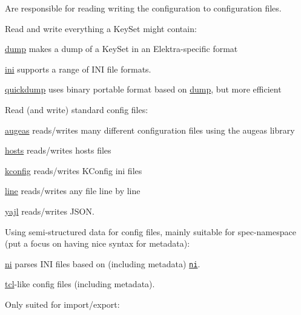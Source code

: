 Are responsible for reading writing the configuration to configuration files.

Read and write everything a Key\+Set might contain\+:


\begin{DoxyItemize}
\item \hyperlink{autotoc_md193_src_plugins_dump_README_md}{dump} makes a dump of a Key\+Set in an Elektra-\/specific format
\item \hyperlink{autotoc_md289_src_plugins_ini_README_md}{ini} supports a range of I\+NI file formats.
\item \hyperlink{autotoc_md562_src_plugins_quickdump_README_md}{quickdump} uses binary portable format based on \hyperlink{autotoc_md193_src_plugins_dump_README_md}{dump}, but more efficient
\end{DoxyItemize}

Read (and write) standard config files\+:


\begin{DoxyItemize}
\item \hyperlink{autotoc_md44_src_plugins_augeas_README_md}{augeas} reads/writes many different configuration files using the augeas library
\item \hyperlink{autotoc_md264_src_plugins_hosts_README_md}{hosts} reads/writes hosts files
\item \hyperlink{autotoc_md350_src_plugins_kconfig_README_md}{kconfig} reads/writes K\+Config ini files
\item \hyperlink{autotoc_md374_src_plugins_line_README_md}{line} reads/writes any file line by line
\item \hyperlink{autotoc_md835_src_plugins_yajl_README_md}{yajl} reads/writes J\+S\+ON.
\end{DoxyItemize}

Using semi-\/structured data for config files, mainly suitable for spec-\/namespace (put a focus on having nice syntax for metadata)\+:


\begin{DoxyItemize}
\item \hyperlink{autotoc_md502_src_plugins_ni_README_md}{ni} parses I\+NI files based on (including metadata) \href{https://lab.burn.capital/chaz-attic/bohr/-/blob/main/include/bohr/ni.h}{\tt ni}.
\item \hyperlink{autotoc_md667_src_plugins_tcl_README_md}{tcl}-\/like config files (including metadata).
\end{DoxyItemize}

Only suited for import/export\+:


